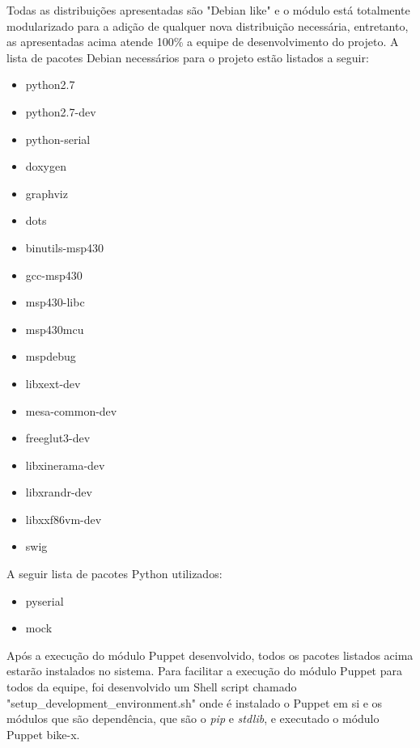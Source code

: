 Todas as distribuições apresentadas são "Debian like" e o módulo está totalmente modularizado para a adição de qualquer nova distribuição necessária, entretanto, as apresentadas acima atende 100\% a equipe de desenvolvimento do projeto. A lista de pacotes Debian necessários para o projeto estão listados a seguir:

\begin{multicols}{2}
\begin{itemize}
\item python2.7
\item python2.7-dev
\item python-serial
\item doxygen
\item graphviz
\item dots
\item binutils-msp430
\item gcc-msp430
\item msp430-libc
\item msp430mcu
\item mspdebug
\item libxext-dev
\item mesa-common-dev
\item freeglut3-dev
\item libxinerama-dev
\item libxrandr-dev
\item libxxf86vm-dev
\item swig
\end{itemize}
\end{multicols}

A seguir lista de pacotes Python utilizados:

\begin{itemize}
\item pyserial
\item mock
\end{itemize}

Após a execução do módulo Puppet desenvolvido, todos os pacotes listados acima estarão instalados no sistema. Para facilitar a execução do módulo Puppet para todos da equipe, foi desenvolvido um Shell script chamado "setup\_development\_environment.sh" onde é instalado o Puppet em si e os módulos que são dependência, que são o \textit{pip} e \textit{stdlib}, e executado o módulo Puppet bike-x.


